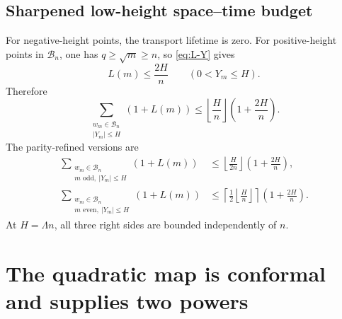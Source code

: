 \documentclass[11pt]{article}
\theoremstyle{definition}
\theoremstyle{remark}
\newcommand{\1}{\mathbf{1}}
\begin{document}
\subsection{Sharpened low-height space--time budget}

For negative-height points, the transport lifetime is zero.  For
positive-height points in $\mathscr B_n$, one has
$q\ge\sqrt m\ge n$, so \cref{eq:L-Y} gives
\begin{equation}
 L(m)\le\frac{2H}{n}
 \qquad(0<Y_m\le H).
 \label{eq:L-H-n}
\end{equation}
Therefore
\begin{equation}
 \boxed{
 \sum_{\substack{w_m\in\mathscr B_n\\|Y_m|\le H}}
 (1+L(m))
 \le
 \left\lfloor\frac{H}{n}\right\rfloor
 \left(1+\frac{2H}{n}\right).
 }
 \label{eq:space-time-budget}
\end{equation}
The parity-refined versions are
\begin{align}
 \sum_{\substack{w_m\in\mathscr B_n\\m\text{ odd},\ |Y_m|\le H}}
 (1+L(m))
 &\le
 \left\lfloor\frac{H}{2n}\right\rfloor
 \left(1+\frac{2H}{n}\right),
 \label{eq:odd-space-time-budget}\\
 \sum_{\substack{w_m\in\mathscr B_n\\m\text{ even},\ |Y_m|\le H}}
 (1+L(m))
 &\le
 \left\lceil\frac{1}{2}
 \left\lfloor\frac{H}{n}\right\rfloor\right\rceil
 \left(1+\frac{2H}{n}\right).
 \label{eq:even-space-time-budget}
\end{align}
At $H=\Lambda n$, all three right sides are bounded independently of
$n$.

\section{The quadratic map is conformal and supplies two powers}
\label{sec:jacobian}
\end{document}
